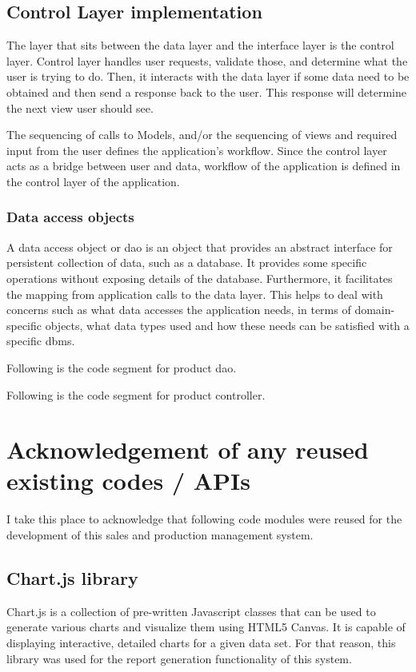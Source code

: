 \documentclass[12pt]{report}
\begin{document}
\subsection{Control Layer implementation}
The layer that sits between the data layer and the interface layer is the control layer. Control layer handles user requests, validate those, and determine what the user is trying to do. Then, it interacts with the data layer if some data need to be obtained and then send a response back to the user. This response will determine the next view user should see.

The sequencing of calls to Models, and/or the sequencing of views and required input from the user defines the application's workflow. Since the control layer acts as a bridge between user and data, workflow of the application is defined in the control layer of the application.

\subsubsection{Data access objects}
A data access object or \acrshort{dao} is an object that provides an abstract interface for persistent collection of data, such as a database. It provides some specific operations without exposing details of the database. Furthermore, it facilitates the mapping from application calls to the data layer. This helps to deal with concerns such as what data accesses the application needs, in terms of  domain-specific objects, what data types used and how these needs can be satisfied with a specific \acrshort{dbms}.

\noindent
Following is the code segment for product dao.



\noindent
Following is the code segment for product controller.



\newpage
\section{Acknowledgement of any reused existing codes / APIs}
I take this place to acknowledge that following code modules were reused for the
development of this sales and production management system.

\subsection{Chart.js library}
Chart.js is a collection of pre-written Javascript classes that can be used to generate various charts and visualize them using HTML5 Canvas. It is capable of displaying interactive, detailed charts for a given data set. For that reason, this library was used for the report generation functionality of this system.
\end{document}
